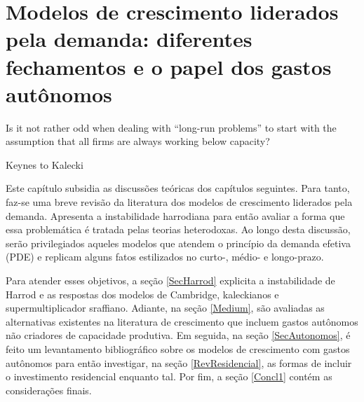 \chapter{Modelos de crescimento liderados pela demanda: diferentes fechamentos e o papel dos gastos autônomos}
\label{CapTeorico}

\epigraph{Is it not rather odd when dealing with ``long-run problems'' to start with the assumption that all firms are always working below capacity?}{Keynes to Kalecki}


Este capítulo subsidia as discussões teóricas dos capítulos seguintes.
Para tanto, faz-se uma breve revisão da literatura dos modelos de crescimento liderados pela demanda. Apresenta a instabilidade harrodiana para então avaliar a forma que essa problemática é tratada pelas teorias heterodoxas.
Ao longo desta discussão, serão privilegiados aqueles modelos que atendem o princípio da demanda efetiva (PDE)  e replicam alguns fatos estilizados no curto-, médio- e longo-prazo.


Para atender esses objetivos, a seção \ref{SecHarrod} explicita a instabilidade de Harrod e as respostas dos modelos de Cambridge, kaleckianos e supermultiplicador sraffiano. 
Adiante, na seção \ref{Medium}, são avaliadas as alternativas existentes na literatura de crescimento que incluem gastos autônomos não criadores de capacidade produtiva.
Em seguida, na seção \ref{SecAutonomos}, é feito um levantamento bibliográfico sobre os modelos de crescimento com gastos autônomos para então investigar, na seção \ref{RevResidencial}, as formas de incluir o investimento residencial enquanto tal.
Por fim, a seção \ref{Concl1} contém as considerações finais.




%



\begin{comment}
mais especificamente:
\begin{itemize}
\item \textbf{Curto-prazo:} Determinação da poupança pelo investimento \cite{keynes_general_1936};
\item \textbf{Médio-prazo:} Relação positiva entre taxa de investimento e crescimento \cite{cesaratto_neo-kaleckian_2015};
\item \textbf{Longo-prazo:} Convergência ao grau de utilização ao normal\footnote{Por grau de utilização normal, adota-se a definição de \textcites[p.~423--4, Original de 1986]{ciccone_2017}: ``\textit{The `normal' utilization of capacity can therefore imply not only the expectation of a certain breadth and frequency of the fluctuations in demand, but also the expectation of the idleness of the excess capacity deliberately chosen by the entrepreneurs;}'' } \cites{ciccone_2017}{vianello_pace_1985}.
\end{itemize}
\end{comment}